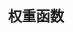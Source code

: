 \documentclass{beamer}%
\begin{document}
\begin{frame}
\vspace{-0.1cm}
{\noindent\large\textbf{权重函数}}
\vspace{0.4cm}




\begin{columns}
\vspace{-0.5cm}
	\begin{column}{0.6\linewidth}


\end{column}
\end{columns}
\end{frame}
\end{document}

